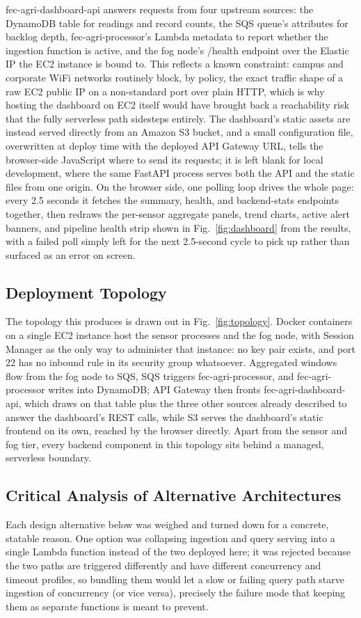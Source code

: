 \documentclass[conference]{IEEEtran}
\begin{document}
fec-agri-dashboard-api answers requests from four upstream sources: the DynamoDB table for readings and record counts, the SQS queue's attributes for backlog depth, fec-agri-processor's Lambda metadata to report whether the ingestion function is active, and the fog node's /health endpoint over the Elastic IP the EC2 instance is bound to. This reflects a known constraint: campus and corporate WiFi networks routinely block, by policy, the exact traffic shape of a raw EC2 public IP on a non-standard port over plain HTTP, which is why hosting the dashboard on EC2 itself would have brought back a reachability risk that the fully serverless path sidesteps entirely. The dashboard's static assets are instead served directly from an Amazon S3 bucket, and a small configuration file, overwritten at deploy time with the deployed API Gateway URL, tells the browser-side JavaScript where to send its requests; it is left blank for local development, where the same FastAPI process serves both the API and the static files from one origin. On the browser side, one polling loop drives the whole page: every 2.5 seconds it fetches the summary, health, and backend-stats endpoints together, then redraws the per-sensor aggregate panels, trend charts, active alert banners, and pipeline health strip shown in Fig.~\ref{fig:dashboard} from the results, with a failed poll simply left for the next 2.5-second cycle to pick up rather than surfaced as an error on screen.

\subsection{Deployment Topology}
The topology this produces is drawn out in Fig.~\ref{fig:topology}. Docker containers on a single EC2 instance host the sensor processes and the fog node, with Session Manager as the only way to administer that instance: no key pair exists, and port 22 has no inbound rule in its security group whatsoever. Aggregated windows flow from the fog node to SQS, SQS triggers fec-agri-processor, and fec-agri-processor writes into DynamoDB; API Gateway then fronts fec-agri-dashboard-api, which draws on that table plus the three other sources already described to answer the dashboard's REST calls, while S3 serves the dashboard's static frontend on its own, reached by the browser directly. Apart from the sensor and fog tier, every backend component in this topology sits behind a managed, serverless boundary.

\subsection{Critical Analysis of Alternative Architectures}
Each design alternative below was weighed and turned down for a concrete, statable reason. One option was collapsing ingestion and query serving into a single Lambda function instead of the two deployed here; it was rejected because the two paths are triggered differently and have different concurrency and timeout profiles, so bundling them would let a slow or failing query path starve ingestion of concurrency (or vice versa), precisely the failure mode that keeping them as separate functions is meant to prevent.
\end{document}
